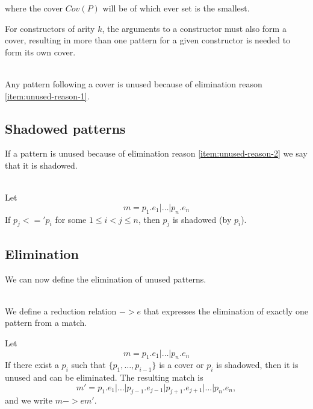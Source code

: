 \noindent
where the cover $Cov(P)$ will be of which ever set is the smallest.

For constructors of arity $k$, the arguments to a constructor must also form a
cover, resulting in more than one pattern for a given constructor is needed to
form its own cover.

\begin{lemma}\ \\
  Any pattern following a cover is unused because of elimination reason
  \ref{item:unused-reason-1}.
\end{lemma}

\subsection{Shadowed patterns}
\label{sec:shadowed-patterns}
If a pattern is unused because of elimination reason \ref{item:unused-reason-2} we say that
it is shadowed.
\begin{definition}[Shadowed]\ \\
  Let
  \[
  m = p_1\texttt{.}e_1 \texttt{|} \ldots \texttt{|} p_n\texttt{.}e_n
  \]
  If $p_j <=' p_i$ for some $1 \leq i < j \leq n$, then $p_j$ is shadowed (by
  $p_i$).
\end{definition}

\subsection{Elimination}

We can now define the elimination of unused patterns.
\begin{definition}[Elimination, $->e$]\ \\
\label{def:shadowed-patterns-1}
  We define a reduction relation $->e$ that expresses the
  elimination of exactly one pattern from a match.

  Let
  \[
  m = p_1\texttt{.}e_1 \texttt{|} \ldots \texttt{|} p_n\texttt{.}e_n
  \]
  If there exist a $p_i$ such that $\{p_1, \ldots, p_{i-1}\}$ is a cover or
  $p_i$ is shadowed, then it is unused and can be eliminated. The resulting
  match is
  \[
  m' = p_1\texttt{.}e_1 \texttt{|} \ldots \texttt{|}
  p_{j-1}\texttt{.}e_{j-1} \texttt{|} p_{j+1}\texttt{.}e_{j+1} \texttt{|}
  \ldots \texttt{|} p_n\texttt{.}e_n,
  \]
  and we write $m ->e m'$.
\end{definition}


